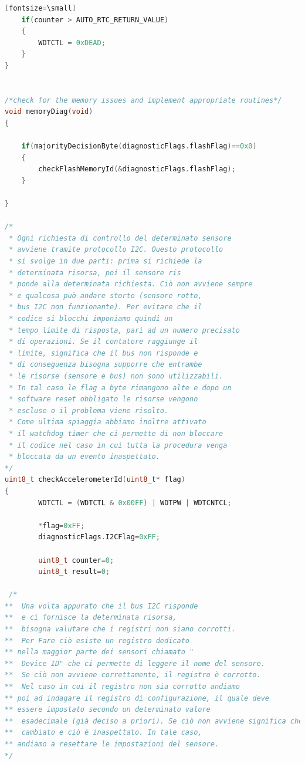 \documentclass[LaM,binding=0.6cm]{../sapthesis}
\begin{document}
\begin{lstlisting}[language=c][fontsize=\small]
    if(counter > AUTO_RTC_RETURN_VALUE)
    {                                             
        WDTCTL = 0xDEAD;
    }
}


/*check for the memory issues and implement appropriate routines*/
void memoryDiag(void)
{
    
    if(majorityDecisionByte(diagnosticFlags.flashFlag)==0x0)
    {
        checkFlashMemoryId(&diagnosticFlags.flashFlag);
    }

}

/*
 * Ogni richiesta di controllo del determinato sensore 
 * avviene tramite protocollo I2C. Questo protocollo 
 * si svolge in due parti: prima si richiede la 
 * determinata risorsa, poi il sensore ris
 * ponde alla determinata richiesta. Ciò non avviene sempre 
 * e qualcosa può andare storto (sensore rotto, 
 * bus I2C non funzionante). Per evitare che il 
 * codice si blocchi imponiamo quindi un
 * tempo limite di risposta, pari ad un numero precisato 
 * di operazioni. Se il contatore raggiunge il 
 * limite, significa che il bus non risponde e 
 * di conseguenza bisogna supporre che entrambe
 * le risorse (sensore e bus) non sono utilizzabili. 
 * In tal caso le flag a byte rimangono alte e dopo un 
 * software reset obbligato le risorse vengono 
 * escluse o il problema viene risolto.
 * Come ultima spiaggia abbiamo inoltre attivato
 * il watchdog timer che ci permette di non bloccare 
 * il codice nel caso in cui tutta la procedura venga
 * bloccata da un evento inaspettato.
*/
uint8_t checkAccelerometerId(uint8_t* flag)
{
        WDTCTL = (WDTCTL & 0x00FF) | WDTPW | WDTCNTCL;
        
        *flag=0xFF;
        diagnosticFlags.I2CFlag=0xFF;

        uint8_t counter=0;
        uint8_t result=0;

 /*
**  Una volta appurato che il bus I2C risponde 
**  e ci fornisce la determinata risorsa, 
**  bisogna valutare che i registri non siano corrotti.
**  Per Fare ciò esiste un registro dedicato 
** nella maggior parte dei sensori chiamato "
**  Device ID" che ci permette di leggere il nome del sensore.
**  Se ciò non avviene correttamente, il registro è corrotto.
**  Nel caso in cui il registro non sia corrotto andiamo 
** poi ad indagare il registro di configurazione, il quale deve 
** essere impostato secondo un determinato valore
**  esadecimale (già deciso a priori). Se ciò non avviene significa che qualcosa è
**  cambiato e ciò è inaspettato. In tale caso, 
** andiamo a resettare le impostazioni del sensore.
*/



\end{lstlisting}
\end{document}
